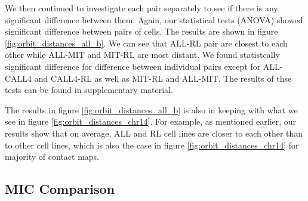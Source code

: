 \documentclass[]{article}
\begin{document}
We then continued to investigate each pair separately to
see if there is any significant difference between them.
Again, our statistical tests (ANOVA) showed significant difference
between pairs of cells.
The results are shown in figure \ref{fig:orbit_distances_all_b}.
We can see that ALL-RL pair are closest to each other while
ALL-MIT and MIT-RL are most distant. We found statistcally
significant difference for difference between individual
pairs except for ALL-CALL4 and CALL4-RL as well as
MIT-RL and ALL-MIT. The results of thse tests 
can be found in supplementary material.

The results in figure \ref{fig:orbit_distances_all_b} is also
in keeping with what we see in figure \ref{fig:orbit_distances_chr14}. For example, as mentioned earlier, our results show that
on average, ALL
and RL cell lines are closer to each other than to other
cell lines, which is also the case in figure
\ref{fig:orbit_distances_chr14} for majority of contact maps.

\subsection{MIC Comparison}
\end{document}
